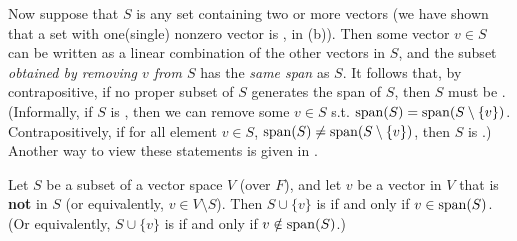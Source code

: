 Now suppose that \(S\) is any \LDP{} set containing two or more vectors
(we have shown that a set with one(single) nonzero vector is \LID{}, in (b)).
Then some vector \(v \in S\) can be written as a linear combination of the other vectors in \(S\), and the subset \emph{obtained by removing \(v\) from \(S\)} has the \emph{same span} as \(S\).
It follows that, by contrapositive, if no proper subset of \(S\) generates the span of \(S\), then \(S\) must be \LID{}.
(Informally, if \(S\) is \LDP{}, then we can remove some \(v \in S\) s.t. \(\operatorname{span}(S) = \operatorname{span}(S \setminus \{ v \})\).
Contrapositively, if for all element \(v \in S\), \(\operatorname{span}(S) \ne \operatorname{span}(S \setminus \{ v \})\), then \(S\) is \LID{}.)
Another way to view these statements is given in .

\begin{theorem} \label{thm 1.7}
Let \(S\) be a \LID{} subset of a vector space \(V\) (over \(F\)), and let \(v\) be a vector in \(V\) that is \textbf{not} in \(S\) (or equivalently, \(v \in V \setminus S\)).
Then \(S \cup \{v\}\) is \LDP{} if and only if \(v \in \operatorname{span}(S)\).
(Or equivalently, \(S \cup \{v\}\) is \LID{}{} if and only if \(v \notin \operatorname{span}(S)\).)
\end{theorem}

